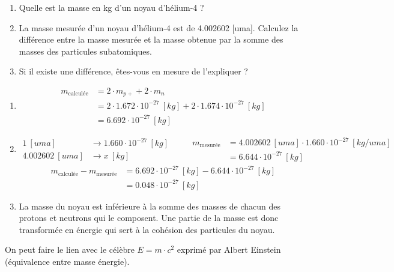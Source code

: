\documentclass[
  11pt,
  a4paper,
  openany]{book}
\providecommand{\tightlist}{%
  \setlength{\itemsep}{0pt}\setlength{\parskip}{0pt}}
\begin{document}
\begin{Exercise}

\begin{enumerate}
\def\labelenumi{\arabic{enumi}.}
\tightlist
\item
  Quelle est la masse en kg d'un noyau d'hélium-4 ?\\
\item
  La masse mesurée d'un noyau d'hélium-4 est de 4.002602 {[}uma{]}. Calculez la différence entre la masse mesurée et la masse obtenue par la somme des masses des particules subatomiques.
\item
  Si il existe une différence, êtes-vous en mesure de l'expliquer ?
\end{enumerate}

\end{Exercise}

\begin{Answer}

\begin{enumerate}
\def\labelenumi{\arabic{enumi}.}
\item
  \[
  \begin{split}
   m_{\text{calculée}} &= 2 \cdot m_{p+} + 2 \cdot m_{n} \\
   &= 2 \cdot 1.672 \cdot 10^{-27} \:[kg] + 2 \cdot 1.674 \cdot 10^{-27} \:[kg] \\
   &= 6.692 \cdot 10^{-27} \:[kg]
  \end{split}
  \]
\item
  \[   
  \begin{split}
   1\:[uma] &\rightarrow 1.660 \cdot 10^{-27} \:[kg] \\
   4.002602\:[uma] &\rightarrow x \:[kg]
  \end{split}
  \qquad
  \begin{split}
   m_{\text{mesurée}} &= 4.002602\:[uma] \cdot 1.660 \cdot 10^{-27} \:[kg/uma] \\
       &= 6.644 \cdot 10^{-27} \:[kg]
  \end{split}
  \]
  \[
  \begin{split}
   m_{\text{calculée}} - m_{\text{mesurée}} &= 6.692 \cdot 10^{-27} \:[kg] - 6.644 \cdot 10^{-27} \:[kg] \\
   &= 0.048 \cdot 10^{-27} \:[kg]
  \end{split}
  \]
\item
  La masse du noyau est inférieure à la somme des masses de chacun des protons et neutrons qui le composent. Une partie de la masse est donc transformée en énergie qui sert à la cohésion des particules du noyau.
\end{enumerate}

On peut faire le lien avec le célèbre \(E=m \cdot c^{2}\) exprimé par Albert Einstein (équivalence entre masse énergie).

\end{Answer}
\end{document}
